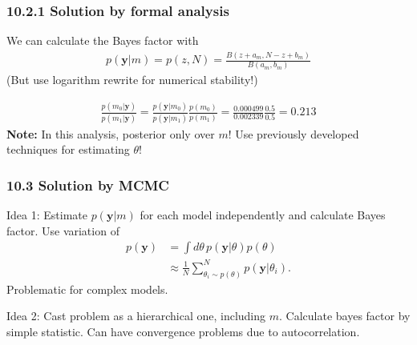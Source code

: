 \documentclass[usenames,dvipsnames,table]{beamer}
\begin{document}
\begin{frame}
\frametitle{10.2.1 Solution by formal analysis}

We can calculate the Bayes factor with
\begin{align*}
p(\mathbf{y}|m) = p(z, N) = \frac{B(z+a_m, N-z+b_m)}{B(a_m, b_m)} \tag{10.6}
\end{align*}
(But use logarithm rewrite for numerical stability!)

\begin{align*}
\frac{p(m_0|\mathbf{y})}
     {p(m_1|\mathbf{y})}
    =  \frac{p(\mathbf{y}|m_0)}
             {p(\mathbf{y}|m_1)}
        \frac{p(m_0)}
             {p(m_1)}
    =  \frac{0.000499}
             {0.002339}
        \frac{0.5}
             {0.5}
    = 0.213
\end{align*}
\textbf{Note:} In this analysis, posterior only over $m$! Use previously developed techniques for estimating $\theta$!

\end{frame}




\begin{frame}
\frametitle{10.3 Solution by MCMC}
Idea 1: Estimate $p(\mathbf{y}|m)$ for each model independently and calculate Bayes factor. Use variation of
\begin{align*}
p(\mathbf{y}) &= \int\! d\theta\, p(\mathbf{y}|\theta) p(\theta) \\
              &\approx \frac{1}{N}\sum_{\theta_i \sim p(\theta)}^N p(\mathbf{y}|\theta_i).
\end{align*}
Problematic for complex models.

\vspace{1em}
Idea 2: Cast problem as a hierarchical one, including $m$. Calculate bayes factor by simple statistic. Can have convergence problems due to autocorrelation.
\end{frame}
\end{document}
